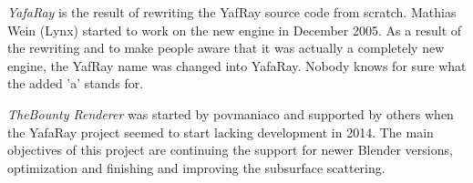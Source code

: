 \bigskip

\textit{YafaRay} is the result of rewriting the YafRay source code from scratch. Mathias Wein (Lynx) started to work on the new engine in December 2005. As a result of the rewriting and to make people aware that it was actually a completely new engine, the YafRay name was changed into YafaRay. Nobody knows for sure what the added 'a' stands for.

\bigskip

\textit{TheBounty Renderer} was started by povmaniaco and supported by others when the YafaRay project seemed to start lacking development in 2014. The main objectives of this project are continuing the support for newer Blender versions, optimization and finishing and improving the subsurface scattering.
